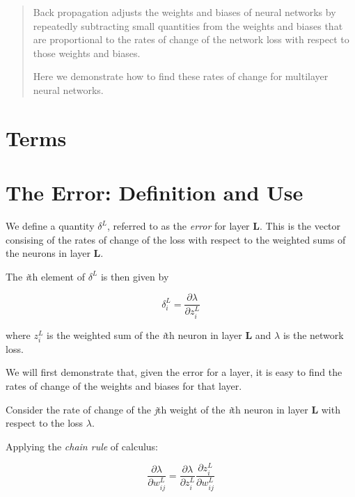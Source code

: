 \documentclass[12pt]{article}
\begin{document}
\maketitle

\begin{abstract}
Back propagation adjusts the weights and biases of neural networks by repeatedly subtracting small quantities from the weights and biases that are proportional to the rates of change of the network loss with respect to those weights and biases.

Here we demonstrate how to find these rates of change for multilayer neural networks. 
\end{abstract}

\section{Terms}

\section{The Error: Definition and Use}

We define a quantity $\delta^{L}$, referred to as the \textit{error} for layer \textbf{L}. This is the vector consising of the rates of change of the loss with respect to the weighted sums of the neurons in layer \textbf{L}.

The \textit{i}th element of $\delta^{L}$ is then given by

\begin{equation} \label{eq:1}
\delta^{L}_{i}=\frac{\partial \lambda}{\partial z_{i}^{L}}
\end{equation}

where $z_{i}^{L}$ is the weighted sum of the \textit{i}th neuron in layer \textbf{L} and $\lambda$ is the network loss.

We will first demonstrate that, given the error for a layer, it is easy to find the rates of change of the weights and biases for that layer.

Consider the rate of change of the \textit{j}th weight of the \textit{i}th neuron in layer \textbf{L} with respect to the loss $\lambda$.

Applying the \textit{chain rule} of calculus:

\begin{equation} \label{eq:2}
\frac{\partial \lambda}{\partial w^{L}_{ij}}=\frac{\partial \lambda}{\partial z^{L}_{i}}
\frac{\partial z^{L}_{i}}{\partial w^{L}_{ij}}\end{equation}
\end{document}
